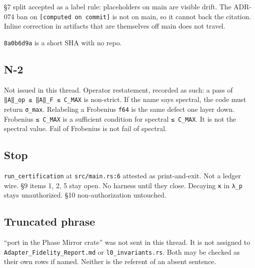 \documentclass[
]{article}
\begin{document}
§7 split accepted as a label rule: placeholders on main are visible
drift. The ADR-074 ban on \texttt{{[}computed\ on\ commit{]}} is not on
main, so it cannot back the citation. Inline correction in artifacts
that are themselves off main does not travel.

\texttt{8a0b6d9a} is a short SHA with no repo.

\hypertarget{n-2}{%
\subsection{N-2}\label{n-2}}

Not issued in this thread. Operator restatement, recorded as such: a
pass of \texttt{‖A‖\_op\ ≤\ ‖A‖\_F\ ≤\ C\_MAX} is non-strict. If the
name says spectral, the code must return \texttt{σ\_max}. Relabeling a
Frobenius \texttt{f64} is the same defect one layer down. Frobenius
\texttt{≤\ C\_MAX} is a sufficient condition for spectral
\texttt{≤\ C\_MAX}. It is not the spectral value. Fail of Frobenius is
not fail of spectral.

\hypertarget{stop}{%
\subsection{Stop}\label{stop}}

\texttt{run\_certification} at \texttt{src/main.rs:6} attested as
print-and-exit. Not a ledger wire. §9 items 1, 2, 5 stay open. No
harness until they close. Decaying \texttt{κ} in \texttt{λ\_p} stays
unauthorized. §10 non-authorization untouched.

\hypertarget{truncated-phrase}{%
\subsection{Truncated phrase}\label{truncated-phrase}}

``port in the Phase Mirror crate'' was not sent in this thread. It is
not assigned to \texttt{Adapter\_Fidelity\_Report.md} or
\texttt{l0\_invariants.rs}. Both may be checked as their own rows if
named. Neither is the referent of an absent sentence.
\end{document}
